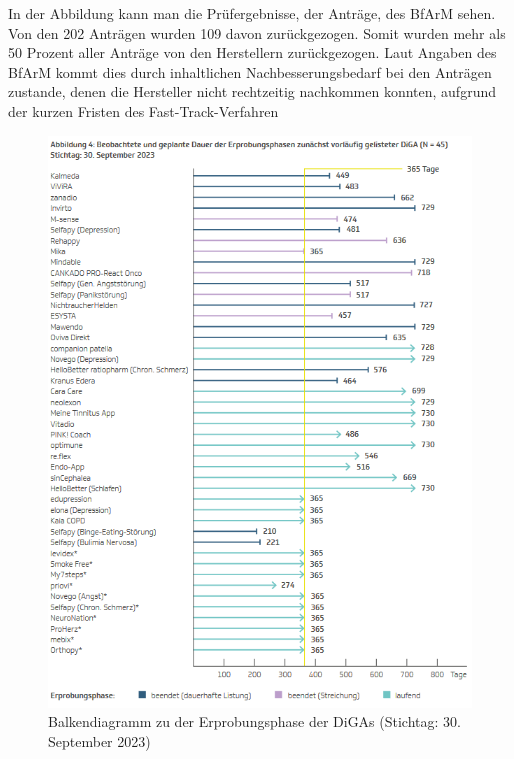 \documentclass{article}
\begin{document}
			In der Abbildung kann man die Prüfergebnisse, der Anträge, des BfArM sehen. Von den 202 Anträgen wurden 109 davon zurückgezogen. Somit wurden mehr als 50 Prozent aller Anträge von den Herstellern zurückgezogen. Laut Angaben des BfArM kommt dies durch inhaltlichen Nachbesserungsbedarf bei den Anträgen zustande, denen die Hersteller nicht rechtzeitig nachkommen konnten, aufgrund der kurzen Fristen des Fast-Track-Verfahren\cite[vgl. Z. 37]{tipps-diga-antragsansteller}   
			\newpage
			\begin{figure}[htbp]
				\includegraphics[height=0.5\textheight]{./grafiken/erprobungs_phase_diga}
				\centering
				\caption[Erprobungsphase von den DiGAs]{Balkendiagramm zu der Erprobungsphase der DiGAs (Stichtag: 30. September 2023)}
				\label{Abb-erprobungsphase-diga}
			\end{figure}
\end{document}
